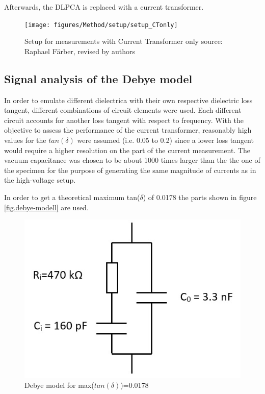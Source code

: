 Afterwards, the DLPCA is replaced with a current transformer. 
\begin{figure}[htbp]
	\centering
	\texttt{[image: figures/Method/setup/setup\_CTonly]}		
	\caption[Kurze Abbildungsbeschreibung]{Setup for measurements with Current Transformer only {source: Raphael F\"arber, revised by authors}} 
	\label{sec.setup}

\end{figure}


\subsection{Signal analysis of the Debye model}

In order to emulate different dielectrica with their own respective dielectric loss tangent, different combinations of circuit elements were used.
Each different circuit accounts for another loss tangent with respect to frequency. With the objective to assess the performance of the current transformer, reasonably high values for the $tan\left(\delta\right)$ were assumed (i.e. 0.05 to 0.2) since a lower loss tangent
would require a higher resolution on the part of the current measurement. The vacuum capacitance was chosen to be about 1000 times larger than
the the one of the specimen for the purpose of generating the same magnitude of currents as in the high-voltage setup.





In order to get a theoretical maximum tan($\delta$) of 0.0178 the parts shown in figure \ref{fig.debye-modell} are used. 
\begin{figure}[h!tb]
	\centerline{\includegraphics[scale=0.7]{figures/Method/debye-modell.jpg}}	
	\caption{Debye model for max($tan(\delta)$)=0.0178 }	
	\label{fig.debye-modellsch}
\end{figure}

